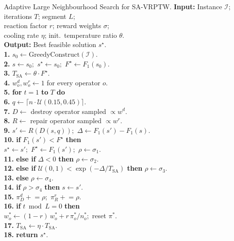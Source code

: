 \begin{pseudocode}{Adaptive Large Neighbourhood Search for SA-VRPTW.}
\label{alg:alns}
\textbf{Input:}\> Instance $\mathcal{I}$; iterations $T$; segment $L$; \\
\>\> reaction factor $r$; reward weights $\sigma$; \\
\>\> cooling rate $\eta$; init.\ temperature ratio $\theta$. \\
\textbf{Output:}\> Best feasible solution $s^\star$. \\[2pt]
\textbf{1.}\> $s_0 \gets \mathrm{GreedyConstruct}(\mathcal{I})$. \\
\textbf{2.}\> $s \gets s_0$;\ $s^\star \gets s_0$;\ $F^\star \gets F_1(s_0)$. \\
\textbf{3.}\> $T_{\mathrm{SA}} \gets \theta \cdot F^\star$. \\
\textbf{4.}\> $w^d_o, w^r_o \gets 1$ for every operator $o$. \\
\textbf{5.}\> \textbf{for} $t = 1$ \textbf{to} $T$ \textbf{do} \\
\textbf{6.}\>\> $q \gets \lceil n \cdot \mathcal{U}(0.15, 0.45) \rceil$. \\
\textbf{7.}\>\> $D \gets$ destroy operator sampled $\propto w^d$. \\
\textbf{8.}\>\> $R \gets$ repair operator sampled $\propto w^r$. \\
\textbf{9.}\>\> $s' \gets R(D(s, q))$;\ $\Delta \gets F_1(s') - F_1(s)$. \\
\textbf{10.}\>\> \textbf{if} $F_1(s') < F^\star$ \textbf{then} \\
\>\>\> $s^\star \gets s'$;\ $F^\star \gets F_1(s')$;\ $\rho \gets \sigma_1$. \\
\textbf{11.}\>\> \textbf{else if} $\Delta < 0$ \textbf{then} $\rho \gets \sigma_2$. \\
\textbf{12.}\>\> \textbf{else if} $\mathcal{U}(0,1) < \exp(-\Delta/T_{\mathrm{SA}})$
\textbf{then} $\rho \gets \sigma_3$. \\
\textbf{13.}\>\> \textbf{else} $\rho \gets \sigma_4$. \\
\textbf{14.}\>\> \textbf{if} $\rho > \sigma_4$ \textbf{then} $s \gets s'$. \\
\textbf{15.}\>\> $\pi^d_D \mathrel{+}= \rho$;\ $\pi^r_R \mathrel{+}= \rho$. \\
\textbf{16.}\>\> \textbf{if} $t \bmod L = 0$ \textbf{then} \\
\>\>\> $w^*_o \gets (1{-}r)\, w^*_o + r\, \pi^*_o / n^*_o$;\ reset $\pi^*$. \\
\textbf{17.}\>\> $T_{\mathrm{SA}} \gets \eta \cdot T_{\mathrm{SA}}$. \\
\textbf{18.}\> \textbf{return} $s^\star$.
\end{pseudocode}

